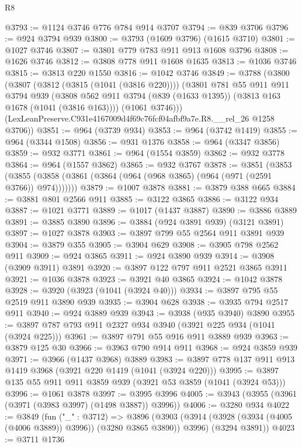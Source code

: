 \begin{lexlean}{R8}
\begin{coremodule}
@3793 := @1124 @3746 @776 @784 @914 @3707
@3794 := @839 @3706
@3796 := @924 @3794 @939
@3800 := @3793 (@1609 @3796) (@1615 @3710)
@3801 := @1027 @3746
@3807 := @3801 @779 @783 @911 @913 @1608 @3796
@3808 := @1626 @3746
@3812 := @3808 @778 @911 @1608 @1635
@3813 := @1036 @3746
@3815 := @3813 @220 @1550
@3816 := @1042 @3746
@3849 := @3788
    (@3800
      (@3807
        (@3812 (@3815 (@1041 (@3816 @220))))
        (@3801
          @781
          @55
          @911
          @911
          @3794
          @939
          (@3808 @562 @911 @3794 (@839 (@1633 @1395)) (@3813 @163 @1678 (@1041 (@3816 @163))))
          (@1061 @3746)))
      (LexLeanPreserve.C931e4167009d4f69c76fcf04afbf9a7e.R8.__rel_26 @1258 @3706))
@3851 := @964 (@3739 @934)
@3853 := @964 (@3742 @1419)
@3855 := @964 (@3344 @1508)
@3856 := @931 @1376
@3858 := @964 (@3347 @3856)
@3859 := @932 @3771
@3861 := @964 (@1554 @3859)
@3862 := @932 @3778
@3864 := @964 (@1557 @3862)
@3865 := @932 @3767
@3878 := @3851
    (@3853 (@3855 (@3858 (@3861 (@3864 (@964 (@968 @3865) (@964 (@971 (@2591 @3766)) @974)))))))
@3879 := @1007 @3878
@3881 := @3879 @388 @665
@3884 := @3881 @801 @2566 @911
@3885 := @3122 @3865
@3886 := @3122 @934
@3887 := @1021 @3771
@3889 := @1017 (@1437 @3887)
@3890 := @3886 @3889
@3891 := @3885 @3890
@3896 := @3884 (@924 @3891 @939) (@3121 @3891)
@3897 := @1027 @3878
@3903 := @3897 @799 @55 @2564 @911 @3891 @939
@3904 := @3879 @355
@3905 := @3904 @629
@3908 := @3905 @798 @2562 @911
@3909 := @924 @3865
@3911 := @924 @3890 @939
@3914 := @3908 (@3909 @3911) @3891
@3920 := @3897 @122 @797 @911 @2521 @3865 @3911
@3921 := @1036 @3878
@3923 := @3921 @40 @3865
@3924 := @1042 @3878
@3928 := @3920 (@3923 (@1041 (@3924 @40)))
@3934 := @3897 @795 @55 @2519 @911 @3890 @939
@3935 := @3904 @628
@3938 := @3935 @794 @2517 @911
@3940 := @924 @3889 @939
@3943 := @3938 (@935 @3940) @3890
@3955 := @3897 @787 @793 @911 @2327 @934 @3940 (@3921 @225 @934 (@1041 (@3924 @225)))
@3961 := @3897 @791 @55 @916 @911 @3889 @939
@3963 := @3879 @125 @30
@3966 := @3963 @790 @914 @911
@3968 := @924 @3859 @939
@3971 := @3966 (@1437 @3968) @3889
@3983 := @3897 @778 @137 @911 @913 @1419 @3968 (@3921 @220 @1419 (@1041 (@3924 @220)))
@3995 := @3897 @135 @55 @911 @911 @3859 @939 (@3921 @53 @3859 (@1041 (@3924 @53)))
@3996 := @1061 @3878
@3997 := @3995 @3996
@4005 := @3943 (@3955 (@3961 (@3971 (@3983 @3997) (@1498 @3887)) @3996))
@4006 := @3280 @934
@4022 := @3849
    (fun ("_" : @3712) =>
    @3896
      (@3903 (@3914 (@3928 (@3934 (@4005 (@4006 @3889)) @3996)) (@3280 @3865 @3890)) @3996)
      (@3294 @3891))
@4023 := @3711 @1736

\end{coremodule}
\end{lexlean}
